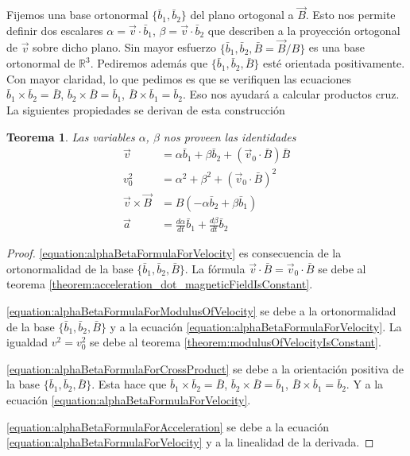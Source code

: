 \documentclass{article}
\newcommand{\realNumbers}{\mathbb{R}}
\newtheorem{theorem}{Teorema}
\begin{document}
  Fijemos una base ortonormal \(\{\bar{b}_1, \bar{b}_2\}\) del plano ortogonal a \(\vec{B}\).
  Esto nos permite definir dos escalares \(\alpha = \vec{v} \cdot \bar{b}_1\), \(\beta = \vec{v} \cdot \bar{b}_2\) que describen a la proyección ortogonal de \(\vec{v}\) sobre dicho plano.
  Sin mayor esfuerzo \(\{\bar{b}_1, \bar{b}_2, \bar{B} = \vec{B} / B\}\) es una base ortonormal de \(\realNumbers^3\).
  Pediremos además que \(\{\bar{b}_1, \bar{b}_2, \bar{B}\}\) esté orientada positivamente.
  Con mayor claridad, lo que pedimos es que se verifiquen las ecuaciones \(\bar{b}_1 \times \bar{b}_2 = \bar{B}\), \(\bar{b}_2 \times \bar{B} = \bar{b}_1\), \(\bar{B} \times \bar{b}_1 = \bar{b}_2\).
  Eso nos ayudará a calcular productos cruz.
  La siguientes propiedades se derivan de esta construcción
  \begin{theorem}
    Las variables \(\alpha\), \(\beta\) nos proveen las identidades
    \begin{align}
      \label{equation:alphaBetaFormulaForVelocity}
      \vec{v}
      &=
      \alpha \bar{b}_1 + \beta \bar{b}_2 + (\vec{v}_0 \cdot \bar{B}) \bar{B}
      \\
      \label{equation:alphaBetaFormulaForModulusOfVelocity}
      v_0^2
      &=
      \alpha^2 + \beta^2 + (\vec{v}_0 \cdot \bar{B})^2
      \\
      \label{equation:alphaBetaFormulaForCrossProduct}
      \vec{v} \times \vec{B}
      &=
      B (- \alpha \bar{b}_2 + \beta \bar{b}_1)
      \\
      \label{equation:alphaBetaFormulaForAcceleration}
      \vec{a}
      &=
      \frac{d \alpha}{d t} \bar{b}_1 + \frac{d \beta}{d t} \bar{b}_2
    \end{align}
  \end{theorem}
  \begin{proof}
    \eqref{equation:alphaBetaFormulaForVelocity}
    es consecuencia de la ortonormalidad de la base \(\{\bar{b}_1, \bar{b}_2, \bar{B}\}\).
    La fórmula \(\vec{v} \cdot \bar{B} = \vec{v}_0 \cdot \bar{B}\) se debe al teorema \ref{theorem:acceleration_dot_magneticFieldIsConstant}.

    \eqref{equation:alphaBetaFormulaForModulusOfVelocity}
    se debe a la ortonormalidad de la base \(\{\bar{b}_1, \bar{b}_2, \bar{B}\}\) y a la ecuación \eqref{equation:alphaBetaFormulaForVelocity}.
    La igualdad \(v^2 = v_0^2\) se debe al teorema \ref{theorem:modulusOfVelocityIsConstant}.

    \eqref{equation:alphaBetaFormulaForCrossProduct}
    se debe a la orientación positiva de la base \(\{\bar{b}_1, \bar{b}_2, \bar{B}\}\).
    Esta hace que \(\bar{b}_1 \times \bar{b}_2 = \bar{B}\), \(\bar{b}_2 \times \bar{B} = \bar{b}_1\), \(\bar{B} \times \bar{b}_1 = \bar{b}_2\).
    Y a la ecuación \eqref{equation:alphaBetaFormulaForVelocity}.

    \eqref{equation:alphaBetaFormulaForAcceleration}
    se debe a la ecuación \eqref{equation:alphaBetaFormulaForVelocity} y a la linealidad de la derivada.
  \end{proof}
\end{document}
